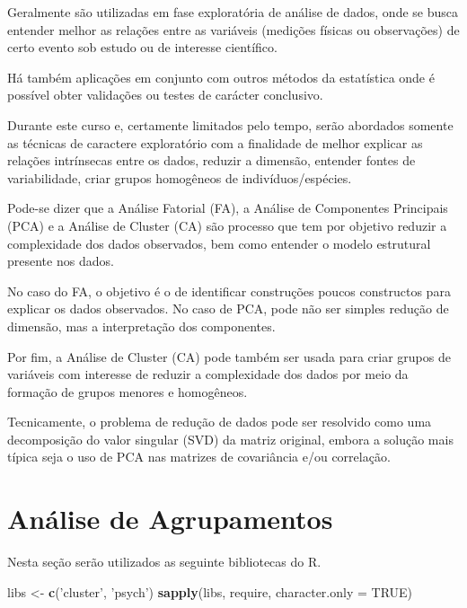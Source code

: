 \documentclass[]{book}
\newenvironment{Shaded}{\begin{snugshade}}{\end{snugshade}}
\newcommand{\KeywordTok}[1]{\textcolor[rgb]{0.13,0.29,0.53}{\textbf{{#1}}}}
\newcommand{\DataTypeTok}[1]{\textcolor[rgb]{0.13,0.29,0.53}{{#1}}}
\newcommand{\StringTok}[1]{\textcolor[rgb]{0.31,0.60,0.02}{{#1}}}
\newcommand{\OtherTok}[1]{\textcolor[rgb]{0.56,0.35,0.01}{{#1}}}
\newcommand{\NormalTok}[1]{{#1}}
\begin{document}
Geralmente são utilizadas em fase exploratória de análise de dados, onde
se busca entender melhor as relações entre as variáveis (medições
físicas ou observações) de certo evento sob estudo ou de interesse
científico.

Há também aplicações em conjunto com outros métodos da estatística onde
é possível obter validações ou testes de carácter conclusivo.

Durante este curso e, certamente limitados pelo tempo, serão abordados
somente as técnicas de caractere exploratório com a finalidade de melhor
explicar as relações intrínsecas entre os dados, reduzir a dimensão,
entender fontes de variabilidade, criar grupos homogêneos de
indivíduos/espécies.

Pode-se dizer que a Análise Fatorial (FA), a Análise de Componentes
Principais (PCA) e a Análise de Cluster (CA) são processo que tem por
objetivo reduzir a complexidade dos dados observados, bem como entender
o modelo estrutural presente nos dados.

No caso do FA, o objetivo é o de identificar construções poucos
constructos para explicar os dados observados. No caso de PCA, pode não
ser simples redução de dimensão, mas a interpretação dos componentes.

Por fim, a Análise de Cluster (CA) pode também ser usada para criar
grupos de variáveis com interesse de reduzir a complexidade dos dados
por meio da formação de grupos menores e homogêneos.

Tecnicamente, o problema de redução de dados pode ser resolvido como uma
decomposição do valor singular (SVD) da matriz original, embora a
solução mais típica seja o uso de PCA nas matrizes de covariância e/ou
correlação.

\chapter{Análise de Agrupamentos}\label{AA}

Nesta seção serão utilizados as seguinte bibliotecas do R.

\begin{Shaded}
\begin{Highlighting}[]
\NormalTok{libs <-}\StringTok{ }\KeywordTok{c}\NormalTok{(}\StringTok{'cluster'}\NormalTok{, }\StringTok{'psych'}\NormalTok{)}
\KeywordTok{sapply}\NormalTok{(libs, require, }\DataTypeTok{character.only =} \OtherTok{TRUE}\NormalTok{)}
\end{Highlighting}
\end{Shaded}
\end{document}
